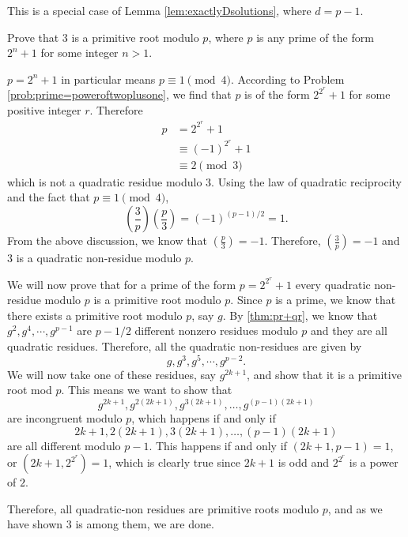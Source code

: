 \documentclass{subfile}
\begin{document}
	\begin{solution}[2]
		This is a special case of Lemma \ref{lem:exactlyDsolutions}, where $d=p-1$.
	\end{solution}

	\begin{problem}
		Prove that $3$ is a primitive root modulo $p$, where $p$ is any prime of the form $2^n+1$ for some integer $n>1$.
	\end{problem}

	\begin{solution}[1]
		$p=2^n+1$ in particular means $p \equiv 1 \pmod{4}$.
		According to Problem \ref{prob:prime=poweroftwoplusone}, we find that $p$ is of the form $2^{2^r} + 1$ for some positive integer $r$. Therefore
			\begin{align*}
				p
					& = 2^{2^{r}} +1\\
					& \equiv (-1)^{2^r} +1\\
					& \equiv 2 \pmod{3}
			\end{align*}
		which is not a quadratic residue modulo $3$.
		Using the law of quadratic reciprocity and the fact that $p \equiv 1 \pmod{4}$,
		\[\left(\dfrac{3}{p}\right) \left(\dfrac{p}{3}\right) = (-1)^{(p-1)/2} =1.\] From the above discussion, we know that $\left( \frac{p}{3} \right) = -1$. Therefore, $\left(\frac{3}{p}\right)=-1$ and $3$ is a quadratic non-residue modulo $p$.

		We will now prove that for a prime of the form $p=2^{2^{r}}+1$ every quadratic non-residue modulo $p$ is a primitive root modulo $p$. Since $p$ is a prime, we know that there exists a primitive root modulo $p$, say $g$. By \autoref{thm:pr+qr}, we know that $g^2,g^4,\cdots,g^{p-1}$ are ${p-1}/{2}$ different nonzero residues modulo $p$ and they are all quadratic residues. Therefore, all the quadratic non-residues are given by $$g,g^3,g^5,\cdots,g^{p-2}.$$
		We will now take one of these residues, say $g^{2k+1}$, and show that it is a primitive root mod ${p}$. This means we want to show that $$g^{2k+1},g^{2(2k+1)},g^{3(2k+1)},\ldots,g^{(p-1)(2k+1)}$$ are incongruent modulo $p$, which  happens if and only if $$2k+1,2(2k+1),3(2k+1),\ldots,(p-1)(2k+1)$$ are all different modulo ${p-1}$. This happens if and only if $(2k+1,p-1)=1$, or $(2k+1,2^{2^r})=1$, which is clearly true since $2k+1$ is odd and $2^{2^{r}}$ is a power of $2$.

		Therefore, all quadratic-non residues are primitive roots modulo $p$, and as we have shown $3$ is among them, we are done.
	\end{solution}
\end{document}
